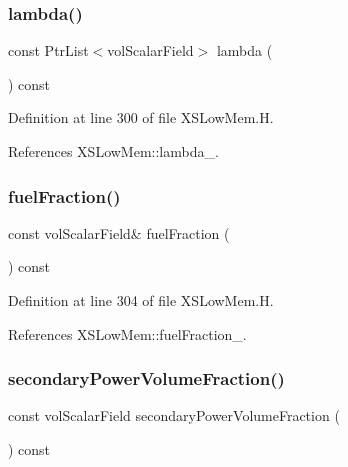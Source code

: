 \subsubsection{\texorpdfstring{lambda()}{lambda()}}
{\footnotesize\ttfamily const Ptr\+List$<$vol\+Scalar\+Field$>$ lambda (\begin{DoxyParamCaption}{ }\end{DoxyParamCaption}) const\hspace{0.3cm}{\ttfamily [inline]}}



Definition at line 300 of file X\+S\+Low\+Mem.\+H.



References X\+S\+Low\+Mem\+::lambda\+\_\+.

\mbox{\label{classFoam_1_1XSLowMem_afcbaacd46910f24a213517f080e5cc6a}} 
\subsubsection{\texorpdfstring{fuel\+Fraction()}{fuelFraction()}}
{\footnotesize\ttfamily const vol\+Scalar\+Field\& fuel\+Fraction (\begin{DoxyParamCaption}{ }\end{DoxyParamCaption}) const\hspace{0.3cm}{\ttfamily [inline]}}



Definition at line 304 of file X\+S\+Low\+Mem.\+H.



References X\+S\+Low\+Mem\+::fuel\+Fraction\+\_\+.

\mbox{\label{classFoam_1_1XSLowMem_a52899ae5805771cf443d9a7e6ba81dc5}} 
\subsubsection{\texorpdfstring{secondary\+Power\+Volume\+Fraction()}{secondaryPowerVolumeFraction()}}
{\footnotesize\ttfamily const vol\+Scalar\+Field secondary\+Power\+Volume\+Fraction (\begin{DoxyParamCaption}{ }\end{DoxyParamCaption}) const\hspace{0.3cm}{\ttfamily [inline]}}



